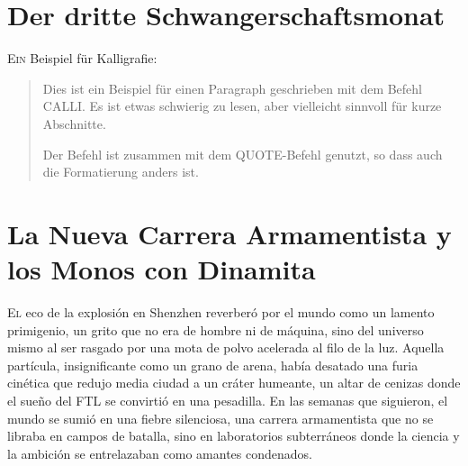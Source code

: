 \chapter*{Der dritte Schwangerschaftsmonat}
\lettrine[lines=2, loversize=0.3, lraise=0]{\initfamily E}{in} Beispiel für Kalligrafie:


\begin{quote} \calli

Dies ist ein Beispiel für einen Paragraph geschrieben mit dem Befehl CALLI. Es ist etwas schwierig zu lesen, aber vielleicht sinnvoll für kurze Abschnitte.

Der Befehl ist zusammen mit dem QUOTE-Befehl genutzt, so dass auch die Formatierung anders ist.
\end{quote}


\chapter{La Nueva Carrera Armamentista y los Monos con Dinamita}

\lettrine[lines=2, loversize=0.3, lraise=0]{E}{l} eco de la explosión en Shenzhen reverberó por el mundo como un lamento primigenio, un grito que no era de hombre ni de máquina, sino del universo mismo al ser rasgado por una mota de polvo acelerada al filo de la luz. Aquella partícula, insignificante como un grano de arena, había desatado una furia cinética que redujo media ciudad a un cráter humeante, un altar de cenizas donde el sueño del FTL se convirtió en una pesadilla. En las semanas que siguieron, el mundo se sumió en una fiebre silenciosa, una carrera armamentista que no se libraba en campos de batalla, sino en laboratorios subterráneos donde la ciencia y la ambición se entrelazaban como amantes condenados.

